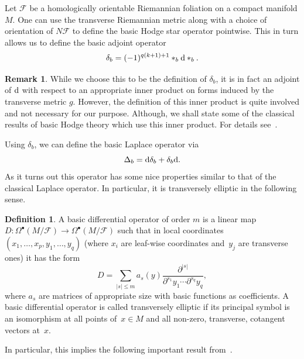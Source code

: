 \documentclass[10pt,a4paper]{amsart}
\numberwithin{equation}{section}
\theoremstyle{definition}
\newtheorem{defi}[tw]{Definition}
\newtheorem{rem}[tw]{Remark}
\begin{document}
Let $\mathcal{F}$ be a homologically orientable Riemannian foliation on a compact manifold $M$. One can use the transverse Riemannian metric along with a choice of orientation of $N\mathcal{F}$ to define the basic Hodge star operator  pointwise. This in turn allows us to define the basic adjoint operator
\[\delta_b=(-1)^{q(k+1)+1}*_b{\rm d}*_b.\]
\begin{rem} While we choose this to be the definition of $\delta_b$, it is in fact an adjoint of ${\rm d}$ with respect to an appropriate inner product on forms induced by the transverse metric $g$. However, the definition of this inner product is quite involved and not necessary for our purpose. Although, we shall state some of the classical results of basic Hodge theory which use this inner product. For details see~\cite{E1}.
\end{rem}
Using $\delta_b$, we can define the basic Laplace operator via
\[\Delta_b={\rm d}\delta_b+\delta_b{\rm d}.\]
As it turns out this operator has some nice properties similar to that of the classical Laplace operator. In particular, it is transversely elliptic in the following sense.

\begin{defi}
A basic differential operator of order $m$ is a linear map ${D\colon\! \Omega^{\bullet}(M\slash\!\mathcal{F})\!\rightarrow\!\Omega^{\bullet}(M\slash\!\mathcal{F})}$ such that in local coordinates $(x_1,\dots,x_p,y_1,\dots,y_q)$ (where $x_i$ are leaf-wise coordinates and~$y_j$ are transverse ones) it has the form
\begin{equation*}
D=\sum\limits_{|s|\leq m}a_s(y)\frac{\partial^{|s|}}{\partial^{s_1}y_1\cdots \partial^{s_q}y_q},
\end{equation*}
where $a_s$ are matrices of appropriate size with basic functions as coefficients. A basic differential operator is called transversely elliptic if its principal symbol is an isomorphism at all points of~${x\in M}$ and all non-zero, transverse, cotangent vectors at~$x$.
\end{defi}

In particular, this implies the following important result from~\cite{E1}.
\end{document}

